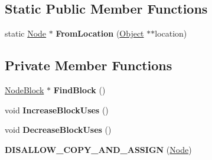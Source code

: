 \subsection*{Static Public Member Functions}
\begin{DoxyCompactItemize}
\item 
static \hyperlink{classv8_1_1internal_1_1_global_handles_1_1_node}{Node} $\ast$ {\bfseries From\+Location} (\hyperlink{classv8_1_1internal_1_1_object}{Object} $\ast$$\ast$location)\hypertarget{classv8_1_1internal_1_1_global_handles_1_1_node_a96d8edb89864010ec5ce1de5835c8e6f}{}\label{classv8_1_1internal_1_1_global_handles_1_1_node_a96d8edb89864010ec5ce1de5835c8e6f}

\end{DoxyCompactItemize}
\subsection*{Private Member Functions}
\begin{DoxyCompactItemize}
\item 
\hyperlink{classv8_1_1internal_1_1_global_handles_1_1_node_block}{Node\+Block} $\ast$ {\bfseries Find\+Block} ()\hypertarget{classv8_1_1internal_1_1_global_handles_1_1_node_a3488a5ee1a9d2b946a5c8def34430747}{}\label{classv8_1_1internal_1_1_global_handles_1_1_node_a3488a5ee1a9d2b946a5c8def34430747}

\item 
void {\bfseries Increase\+Block\+Uses} ()\hypertarget{classv8_1_1internal_1_1_global_handles_1_1_node_afcef17e84de67b73ccc2e02025f1c326}{}\label{classv8_1_1internal_1_1_global_handles_1_1_node_afcef17e84de67b73ccc2e02025f1c326}

\item 
void {\bfseries Decrease\+Block\+Uses} ()\hypertarget{classv8_1_1internal_1_1_global_handles_1_1_node_a14b4d1f0d307e17c51bee8f9ea500436}{}\label{classv8_1_1internal_1_1_global_handles_1_1_node_a14b4d1f0d307e17c51bee8f9ea500436}

\item 
{\bfseries D\+I\+S\+A\+L\+L\+O\+W\+\_\+\+C\+O\+P\+Y\+\_\+\+A\+N\+D\+\_\+\+A\+S\+S\+I\+GN} (\hyperlink{classv8_1_1internal_1_1_global_handles_1_1_node}{Node})\hypertarget{classv8_1_1internal_1_1_global_handles_1_1_node_a13034fe74288bb4d2f2f8eb247719140}{}\label{classv8_1_1internal_1_1_global_handles_1_1_node_a13034fe74288bb4d2f2f8eb247719140}

\end{DoxyCompactItemize}
